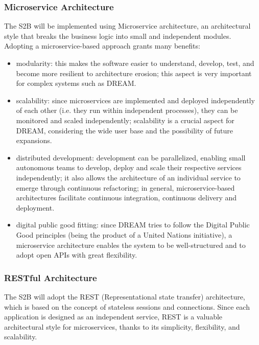 
\subsubsection{Microservice Architecture}
The S2B will be implemented using Microservice architecture, an architectural style that breaks the business logic into small and independent modules. 
\newline
\newline
Adopting a microservice-based approach grants many benefits:
\begin{itemize}
    \item modularity: this makes the software easier to understand, develop, test, and become more resilient to architecture erosion; this aspect is very important for complex systems such as DREAM.
    \item scalability: since microservices are implemented and deployed independently of each other (i.e. they run within independent processes), they can be monitored and scaled independently; scalability is a crucial aspect for DREAM, considering the wide user base and the possibility of future expansions.
    \item distributed development: development can be parallelized, enabling small autonomous teams to develop, deploy and scale their respective services independently; it also allows the architecture of an individual service to emerge through continuous refactoring; in general, microservice-based architectures facilitate continuous integration, continuous delivery and deployment.
    \item digital public good fitting: since DREAM tries to follow the Digital Public Good principles (being the product of a United Nations initiative), a microservice architecture enables the system to be well-structured and to adopt open APIs with great flexibility.
\end{itemize}

\subsubsection{RESTful Architecture}
The S2B will adopt the REST (Representational state transfer) architecture, which is based on the concept of stateless sessions and connections. Since each application is designed as an independent service, REST is a valuable architectural style for microservices, thanks to its simplicity, flexibility, and scalability. 

